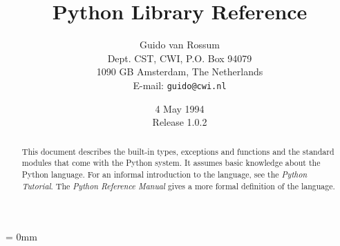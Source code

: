 
\title{Python Library Reference}

\author{
	Guido van Rossum \\
	Dept. CST, CWI, P.O. Box 94079 \\
	1090 GB Amsterdam, The Netherlands \\
	E-mail: {\tt guido@cwi.nl}
}

\date{4 May 1994 \\ Release 1.0.2} %

\makeindex			%





\maketitle

\begin{abstract}

\noindent
This document describes the built-in types, exceptions and functions
and the standard modules that come with the Python system.  It assumes
basic knowledge about the Python language.  For an informal
introduction to the language, see the {\em Python Tutorial}.  The {\em
Python Reference Manual} gives a more formal definition of the
language.

\end{abstract}

\pagebreak

{
\parskip = 0mm
\tableofcontents
}

\pagebreak































